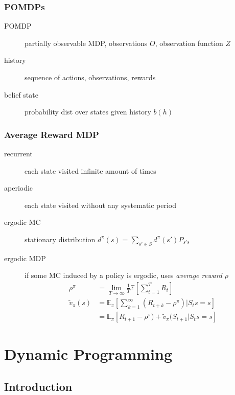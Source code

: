 \documentclass[]{article}
\theoremstyle{definition}
\newcommand{\E}{\mathbb{E}}
\begin{document}
\subsubsection{POMDPs}
\label{ssub:pomdps}

\begin{description}
    \item[POMDP] partially observable MDP, observations $O$, observation function $Z$
    \item[history] sequence of actions, observations, rewards
    \item [belief state] probability dist over states given history $b(h)$
\end{description}

\subsubsection{Average Reward MDP}
\label{ssub:average_reward_mdp}

\begin{description}
    \item [recurrent] each state visited infinite amount of times
    \item [aperiodic] each state visited without any systematic period
    \item [ergodic MC] stationary distribution $d^\pi(s) = \sum_{s' \in S} d^\pi(s')P_{s's}$
    \item [ergodic MDP] if some MC induced by a policy is ergodic, uses \textit{average reward} $\rho$ \\
        \begin{align*}
            \rho^\pi &= \lim_{T \to \infty} \frac{1}{T} \E [\sum_{t=1}^T R_t] \\
            \tilde v_\pi(s) &= \E_\pi [\sum_{k=1}^\infty (R_{t+k} - \rho^\pi) | S_ts = s] \\
                            &= \E_\pi [R_{t+1} - \rho^\pi)  + \tilde v_\pi(S_{t+1}| S_ts = s]
        \end{align*}
\end{description}


\section{Dynamic Programming}
\label{sec:dynamic_programming}

\subsection{Introduction}
\label{sub:dp_introduction}
\end{document}

